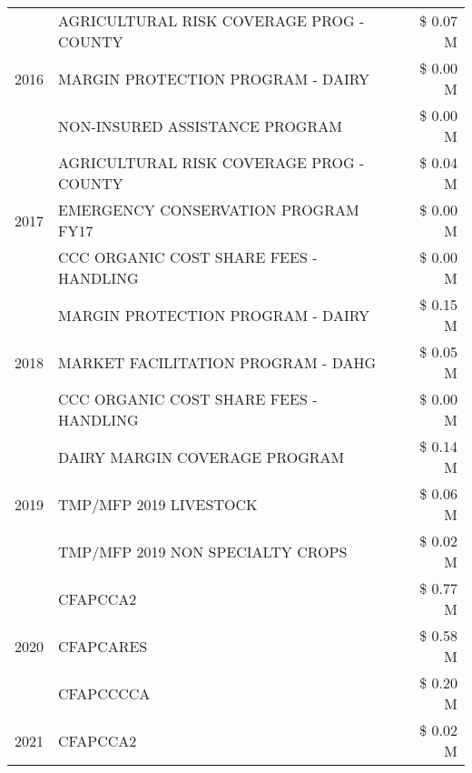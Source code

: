 \begin{tabular}{llr}
\cline{1-3}
\multirow[t]{3}{*}{2016} & AGRICULTURAL RISK COVERAGE PROG - COUNTY & \$ 0.07 M \\
 & MARGIN PROTECTION PROGRAM - DAIRY & \$ 0.00 M \\
 & NON-INSURED ASSISTANCE PROGRAM & \$ 0.00 M \\
\cline{1-3}
\multirow[t]{3}{*}{2017} & AGRICULTURAL RISK COVERAGE PROG - COUNTY & \$ 0.04 M \\
 & EMERGENCY CONSERVATION PROGRAM FY17 & \$ 0.00 M \\
 & CCC ORGANIC COST SHARE FEES - HANDLING & \$ 0.00 M \\
\cline{1-3}
\multirow[t]{3}{*}{2018} & MARGIN PROTECTION PROGRAM - DAIRY & \$ 0.15 M \\
 & MARKET FACILITATION PROGRAM - DAHG & \$ 0.05 M \\
 & CCC ORGANIC COST SHARE FEES - HANDLING & \$ 0.00 M \\
\cline{1-3}
\multirow[t]{3}{*}{2019} & DAIRY MARGIN COVERAGE PROGRAM & \$ 0.14 M \\
 & TMP/MFP 2019 LIVESTOCK & \$ 0.06 M \\
 & TMP/MFP 2019 NON SPECIALTY CROPS & \$ 0.02 M \\
\cline{1-3}
\multirow[t]{3}{*}{2020} & CFAPCCA2 & \$ 0.77 M \\
 & CFAPCARES & \$ 0.58 M \\
 & CFAPCCCCA & \$ 0.20 M \\
\cline{1-3}
2021 & CFAPCCA2 & \$ 0.02 M \\
\cline{1-3}
\bottomrule
\end{tabular}
